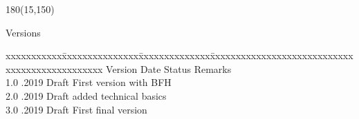 
\begin{textblock}{180}(15,150)
\color{black}
\begin{huge}
Versions
\end{huge}
\vspace{10mm}

\fontsize{10pt}{18pt}\selectfont
\begin{tabbing}
xxxxxxxxxxx\=xxxxxxxxxxxxxxx\=xxxxxxxxxxxxxx\=xxxxxxxxxxxxxxxxxxxxxxxxxxxxxxxxxxxxxxxxxxxxxxx \kill
Version	\> Date	\> Status			\> Remarks		\\
1.0	.2019	\> Draft		\> First version with BFH	\\	
2.0	.2019	\> Draft		\> added technical basics	\\	
3.0	.2019	\> Draft		\> First final version	\\	

\end{tabbing}

\end{textblock}
